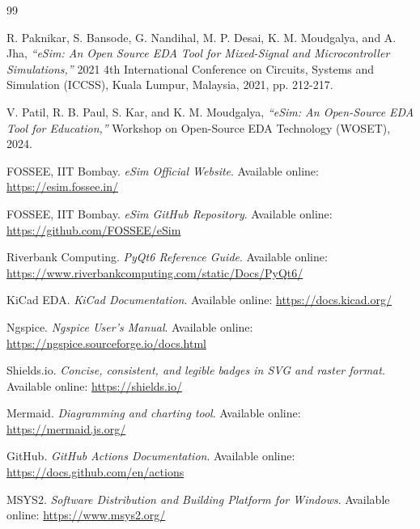 \documentclass[12pt,a4paper]{report}
\begin{document}
\begin{thebibliography}{99}

R. Paknikar, S. Bansode, G. Nandihal, M. P. Desai, K. M. Moudgalya, and A. Jha, 
\textit{``eSim: An Open Source EDA Tool for Mixed-Signal and Microcontroller Simulations,''} 
2021 4th International Conference on Circuits, Systems and Simulation (ICCSS), Kuala Lumpur, Malaysia, 2021, pp. 212-217.

V. Patil, R. B. Paul, S. Kar, and K. M. Moudgalya, 
\textit{``eSim: An Open-Source EDA Tool for Education,''} 
Workshop on Open-Source EDA Technology (WOSET), 2024.

FOSSEE, IIT Bombay. \textit{eSim Official Website}. 
Available online: \url{https://esim.fossee.in/}

FOSSEE, IIT Bombay. \textit{eSim GitHub Repository}. 
Available online: \url{https://github.com/FOSSEE/eSim}

Riverbank Computing. \textit{PyQt6 Reference Guide}. 
Available online: \url{https://www.riverbankcomputing.com/static/Docs/PyQt6/}

KiCad EDA. \textit{KiCad Documentation}. 
Available online: \url{https://docs.kicad.org/}

Ngspice. \textit{Ngspice User's Manual}. 
Available online: \url{https://ngspice.sourceforge.io/docs.html}

Shields.io. \textit{Concise, consistent, and legible badges in SVG and raster format}. 
Available online: \url{https://shields.io/}

Mermaid. \textit{Diagramming and charting tool}. 
Available online: \url{https://mermaid.js.org/}

GitHub. \textit{GitHub Actions Documentation}. 
Available online: \url{https://docs.github.com/en/actions}

MSYS2. \textit{Software Distribution and Building Platform for Windows}. 
Available online: \url{https://www.msys2.org/}

\end{thebibliography}
\end{document}
